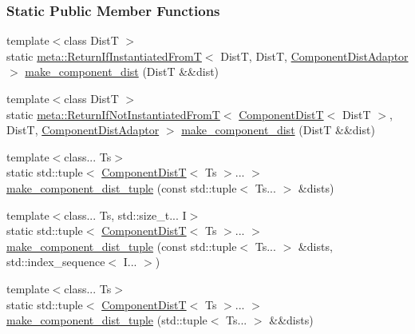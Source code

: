 \subsubsection*{Static Public Member Functions}
\begin{DoxyCompactItemize}
\item 
{\footnotesize template$<$class DistT $>$ }\\static \hyperlink{namespaceprior__hessian_1_1meta_ab7bb340f7fc79b7a874c3d407fca091d}{meta\+::\+Return\+If\+Instantiated\+FromT}$<$ DistT, DistT, \hyperlink{classprior__hessian_1_1CompositeDist_classprior__hessian_1_1CompositeDist_1_1ComponentDistAdaptor}{Component\+Dist\+Adaptor} $>$ \hyperlink{classprior__hessian_1_1CompositeDist_a9473495959c5c652e0eb20fe33545441}{make\+\_\+component\+\_\+dist} (DistT \&\&dist)
\item 
{\footnotesize template$<$class DistT $>$ }\\static \hyperlink{namespaceprior__hessian_1_1meta_aea50a7973fa87d00d93e526c23d14549}{meta\+::\+Return\+If\+Not\+Instantiated\+FromT}$<$ \hyperlink{classprior__hessian_1_1CompositeDist_ab9b58a9ef851c7d5453273785d915c34}{Component\+DistT}$<$ DistT $>$, DistT, \hyperlink{classprior__hessian_1_1CompositeDist_classprior__hessian_1_1CompositeDist_1_1ComponentDistAdaptor}{Component\+Dist\+Adaptor} $>$ \hyperlink{classprior__hessian_1_1CompositeDist_ac035adf066e3b04c42485248be85fd85}{make\+\_\+component\+\_\+dist} (DistT \&\&dist)
\item 
{\footnotesize template$<$class... Ts$>$ }\\static std\+::tuple$<$ \hyperlink{classprior__hessian_1_1CompositeDist_ab9b58a9ef851c7d5453273785d915c34}{Component\+DistT}$<$ Ts $>$... $>$ \hyperlink{classprior__hessian_1_1CompositeDist_a0a2be1ee1e4b13310575089c3cacbe23}{make\+\_\+component\+\_\+dist\+\_\+tuple} (const std\+::tuple$<$ Ts... $>$ \&dists)
\item 
{\footnotesize template$<$class... Ts, std\+::size\+\_\+t... I$>$ }\\static std\+::tuple$<$ \hyperlink{classprior__hessian_1_1CompositeDist_ab9b58a9ef851c7d5453273785d915c34}{Component\+DistT}$<$ Ts $>$... $>$ \hyperlink{classprior__hessian_1_1CompositeDist_a203677b1eebcc71684aeb1776b8b343a}{make\+\_\+component\+\_\+dist\+\_\+tuple} (const std\+::tuple$<$ Ts... $>$ \&dists, std\+::index\+\_\+sequence$<$ I... $>$)
\item 
{\footnotesize template$<$class... Ts$>$ }\\static std\+::tuple$<$ \hyperlink{classprior__hessian_1_1CompositeDist_ab9b58a9ef851c7d5453273785d915c34}{Component\+DistT}$<$ Ts $>$... $>$ \hyperlink{classprior__hessian_1_1CompositeDist_a67a3e5c72be64eabc4716a73a1a4eb91}{make\+\_\+component\+\_\+dist\+\_\+tuple} (std\+::tuple$<$ Ts... $>$ \&\&dists)

\end{DoxyCompactItemize}
